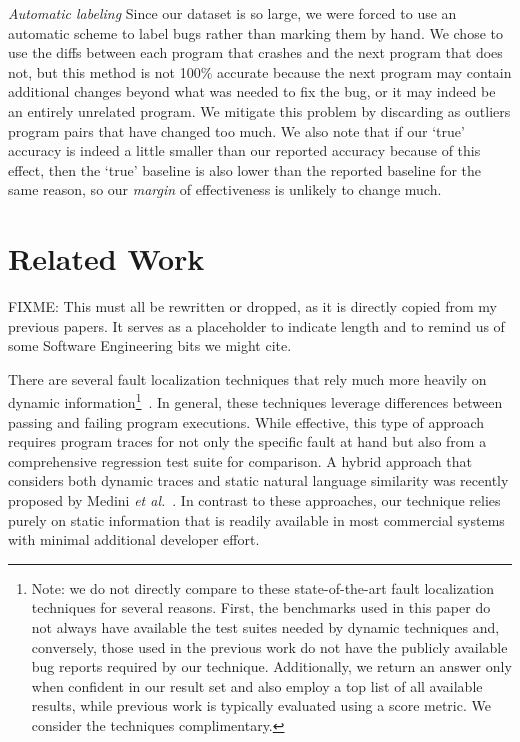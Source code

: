 \documentclass[conference]{IEEEtran}
\begin{document}
\emph{Automatic labeling} Since our dataset is so large, we were forced to use an automatic
scheme to label bugs rather than marking them by hand. We chose to use the diffs
between each program that crashes and the next program that does not, but this method
is not 100\% accurate because the next program may contain additional changes
beyond what was needed to fix the bug, or it may indeed be an entirely unrelated
program. We mitigate this problem by discarding as outliers program pairs that have
changed too much. We also note that if our `true' accuracy is indeed a little
smaller than our reported accuracy because of this effect, then the `true' baseline
is also lower than the reported baseline for the same reason, so our
\emph{margin} of effectiveness is unlikely to change much.

\section{Related Work}
FIXME: This must all be rewritten or dropped, as it is directly copied from
my previous papers. It serves as a placeholder to indicate length and to
remind us of some Software Engineering bits we might cite.

There are several fault localization techniques that rely much more heavily
on dynamic information\footnote{Note: we do not directly compare to these
state-of-the-art fault localization techniques for several reasons.  First,
the benchmarks used in this paper do not always have available the test
suites needed by dynamic techniques and, conversely, those used in the
previous work do not have the publicly available bug reports required
by our technique.  Additionally, we return an answer only when confident in
our result set and also employ a top list of all available results, while
previous work is typically evaluated using a score metric.  We consider the
techniques complimentary.}~\cite
{harrold05,Renieris03,cleve05,wang09}.
In general,
these techniques leverage differences between passing and failing program
executions.  While effective, this type of approach requires program traces
for not only the specific fault at hand but also from a comprehensive regression
test suite for comparison.
A hybrid approach that considers both dynamic
traces and static natural language similarity was recently proposed by
Medini \textit{et al.}~\cite{Medini11}.
In contrast to these approaches, our technique relies purely on static
information that is readily available in most commercial systems with minimal
additional developer effort.
\end{document}
